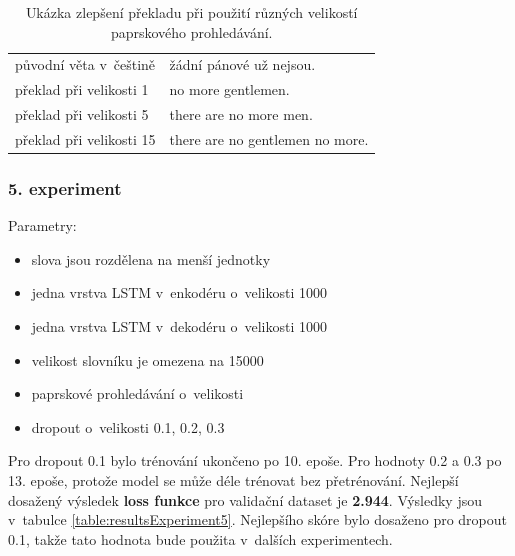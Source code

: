 \begin{table}[H]
    \begin{center}
        \begin{tabular}{ll}
          \toprule
          původní věta v~češtině & žádní pánové už nejsou. \\
          překlad při velikosti 1 & no more gentlemen. \\
          překlad při velikosti 5 & there are no more men. \\
          překlad při velikosti 15 & there are no gentlemen no more. \\
          \bottomrule
        \end{tabular}
    \end{center}
	\caption{Ukázka zlepšení překladu při použití různých velikostí paprskového prohledávání.}
	\label{table:beamTranslation}
\end{table}

\subsubsection{5. experiment}\label{experiment5}
Parametry:
\begin{itemize}
  \item slova jsou rozdělena na menší jednotky
  \item jedna vrstva LSTM v~enkodéru o~velikosti 1000
  \item jedna vrstva LSTM v~dekodéru o~velikosti 1000
  \item velikost slovníku je omezena na 15000
  \item paprskové prohledávání o~velikosti
  \item dropout o~velikosti 0.1, 0.2, 0.3
\end{itemize}

 Pro dropout 0.1 bylo trénování ukončeno po 10. epoše. Pro hodnoty 0.2 a 0.3 po 13. epoše, protože model se může déle trénovat bez přetrénování. Nejlepší dosažený výsledek \textbf{loss funkce} pro validační dataset je \textbf{2.944}. Výsledky jsou v~tabulce \ref{table:resultsExperiment5}. Nejlepšího skóre bylo dosaženo pro dropout 0.1, takže tato hodnota bude použita v~dalších experimentech.

